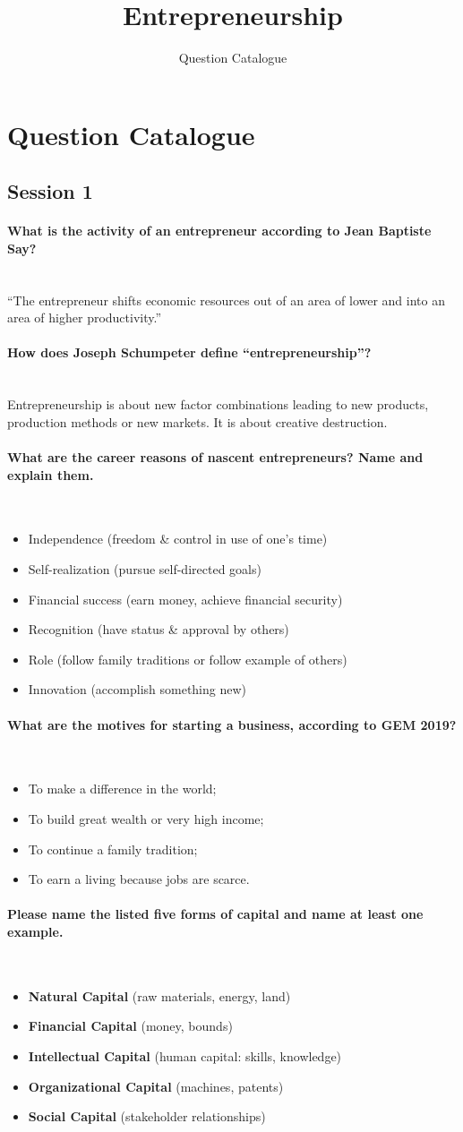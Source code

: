 \documentclass[10pt,a4paper,noendnumber=true]{scrartcl}
\title{Entrepreneurship}
\subtitle{Question Catalogue}
\author{}
\newcommand{\properparagraph}[1]{\paragraph{\textcolor{Emerald}{#1}}\mbox{}\\}
\begin{document}
\maketitle

\section{Question Catalogue}
\subsection{Session 1}
\properparagraph{What is the activity of an entrepreneur according to Jean Baptiste Say?}
"`The entrepreneur shifts economic resources out of an area of lower and into an area of higher productivity."'

\properparagraph{How does Joseph Schumpeter define “entrepreneurship”?}
Entrepreneurship is about new factor combinations
leading to new products, production methods or new
markets. It is about creative destruction.

\properparagraph{What are the career reasons of nascent entrepreneurs? Name and explain them.}
\begin{itemize}
	\item Independence (freedom \& control in use of one’s time)
	\item Self-realization (pursue self-directed goals)
	\item Financial success (earn money, achieve financial security)
	\item Recognition (have status \& approval by others)
	\item Role (follow family traditions or follow example of others)
	\item Innovation (accomplish something new)
\end{itemize}

\properparagraph{What are the motives for starting a business, according to GEM 2019?}
\begin{itemize}
	\item To make a difference in the world;
	\item To build great wealth or very high income;
	\item To continue a family tradition;
	\item To earn a living because jobs are scarce.
\end{itemize}

\properparagraph{Please name the listed five forms of capital and name at least one example.}
\begin{itemize}
	\item \textbf{Natural Capital} (raw materials, energy, land)
	\item \textbf{Financial Capital} (money, bounds)
	\item \textbf{Intellectual Capital} (human capital: skills, knowledge)
	\item \textbf{Organizational Capital} (machines, patents)
	\item \textbf{Social Capital} (stakeholder relationships)
\end{itemize}
\end{document}
